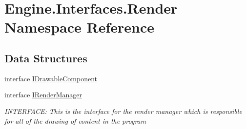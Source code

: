 \hypertarget{a00261}{}\section{Engine.\+Interfaces.\+Render Namespace Reference}
\label{a00261}
\subsection*{Data Structures}
\begin{DoxyCompactItemize}
\item 
interface \hyperlink{a00454}{I\+Drawable\+Component}
\item 
interface \hyperlink{a00458}{I\+Render\+Manager}
\begin{DoxyCompactList}\small\item\em I\+N\+T\+E\+R\+F\+A\+CE\+: This is the interface for the render manager which is responsible for all of the drawing of content in the program \end{DoxyCompactList}\end{DoxyCompactItemize}

